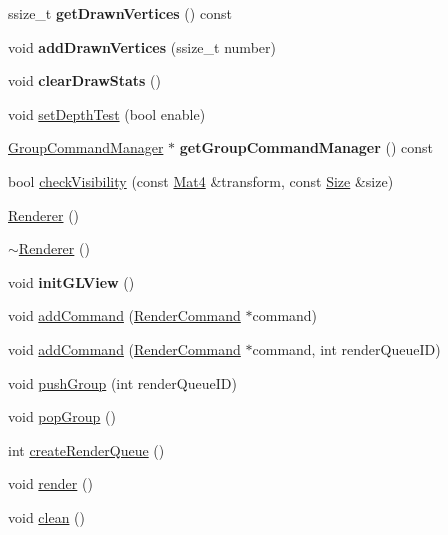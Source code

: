 \begin{DoxyCompactItemize}
ssize\+\_\+t {\bfseries get\+Drawn\+Vertices} () const
\item 
\mbox{\label{classRenderer_a1bb1dbcc8c83b7fc0652d8fafa0a924a}} 
void {\bfseries add\+Drawn\+Vertices} (ssize\+\_\+t number)
\item 
\mbox{\label{classRenderer_a79e7e34a4d1d1c03f10dda28395597a4}} 
void {\bfseries clear\+Draw\+Stats} ()
\item 
void \hyperlink{classRenderer_a6d81add581a355d8da31c51702f398d4}{set\+Depth\+Test} (bool enable)
\item 
\mbox{\label{classRenderer_af9f29f3a34e57c05de86fc0f5416d579}} 
\hyperlink{classGroupCommandManager}{Group\+Command\+Manager} $\ast$ {\bfseries get\+Group\+Command\+Manager} () const
\item 
bool \hyperlink{classRenderer_a00f5f0b6bc05c02965d98dbfd5e4e0bb}{check\+Visibility} (const \hyperlink{classMat4}{Mat4} \&transform, const \hyperlink{classSize}{Size} \&size)
\item 
\hyperlink{classRenderer_a7ebf46f54dab9905f79b80f7fddb76a6}{Renderer} ()
\item 
\hyperlink{classRenderer_afeee408862d5bd6255a6882d47e6d5cd}{$\sim$\+Renderer} ()
\item 
\mbox{\label{classRenderer_abf81af4b7517ee396148032c004589ca}} 
void {\bfseries init\+G\+L\+View} ()
\item 
void \hyperlink{classRenderer_a139f9b3af45019ab6ec84743d83eff0c}{add\+Command} (\hyperlink{classRenderCommand}{Render\+Command} $\ast$command)
\item 
void \hyperlink{classRenderer_a1f3d985bb6e68a761af9b5eeab87282f}{add\+Command} (\hyperlink{classRenderCommand}{Render\+Command} $\ast$command, int render\+Queue\+ID)
\item 
void \hyperlink{classRenderer_aa2da1f3530bf2033be91a1d1489bbb57}{push\+Group} (int render\+Queue\+ID)
\item 
void \hyperlink{classRenderer_a76f0edf8fec541dd32f4c188bd5469de}{pop\+Group} ()
\item 
int \hyperlink{classRenderer_a8a199907ebd8389f15595cfbd37042df}{create\+Render\+Queue} ()
\item 
void \hyperlink{classRenderer_af7e5f8f68742f198e315fb4683a605a4}{render} ()
\item 
void \hyperlink{classRenderer_a609184e9e7ed6bf88448458ffc229981}{clean} ()

\end{DoxyCompactItemize}

